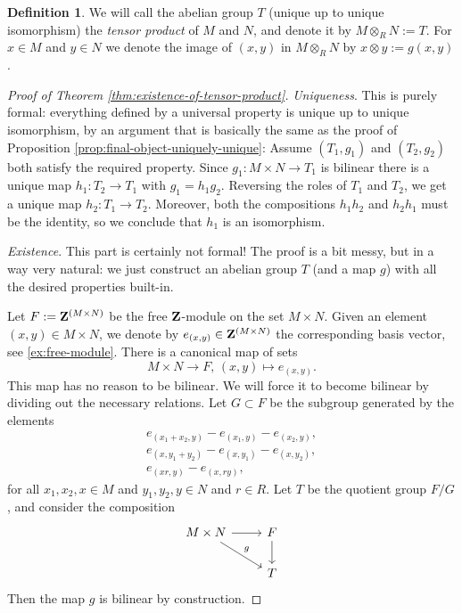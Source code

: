 \documentclass[11pt]{amsbook}
\theoremstyle{plain}
\theoremstyle{definition}
\newtheorem{definition}[theorem]{Definition}
\begin{document}
\begin{definition}We will call the abelian group $T$ (unique up to unique isomorphism) the \emph{tensor product} of $M$ and $N$, and denote it by $M\otimes_R N := T $. For $x\in M$ and $y\in N$ we denote the image of $(x,y)$ in $M\otimes_R N$ by $x\otimes y := g(x,y)$. 
\end{definition}


\begin{proof}[Proof of Theorem \ref{thm:existence-of-tensor-product}]
\emph{Uniqueness}. This is purely formal:  everything defined by a universal property is unique up to unique isomorphism, by an argument  that is basically the same as the proof of Proposition \ref{prop:final-object-uniquely-unique}: 
Assume $(T_1,g_1)$ and $(T_2,g_2)$ both satisfy the required property. Since $g_1\colon M\times N \to T_1$ is bilinear there is a unique map $h_1\colon T_2 \to T_1$ with $g_1=h_1g_2$. Reversing the roles of $T_1$ and $T_2$, we get a unique map $h_2\colon T_1\to T_2$. Moreover, both the compositions $h_1h_2$ and $h_2h_1$ must be the identity, so we conclude that $h_1$ is an isomorphism.

\emph{Existence}. This part is certainly not formal! The proof is a bit messy, but in a way very natural: we just construct an abelian group $T$ (and a map $g$) with all the desired properties built-in. 

Let $F:={\mathbf{Z}}^{(M\times N)}$ be the free ${\mathbf{Z}}$-module on the set $M\times N$. Given an element $(x,y) \in M\times N$, we denote by $e_{(x,y)} \in {\mathbf{Z}}^{(M\times N)}$ the corresponding basis vector, see \ref{ex:free-module}. There is a canonical map of sets
\[
	M\times N \to F,\, (x,y) \mapsto e_{(x,y)}.
\]
This map has no reason to be bilinear. We will force it to become bilinear by dividing out the necessary relations. Let $G\subset F$ be the subgroup generated by the elements
\begin{gather*}
	e_{(x_1+x_2,y)}-e_{(x_1,y)}-e_{(x_2,y)},\\
	e_{(x,y_1+y_2)}-e_{(x,y_1)}-e_{(x,y_2)},\\
	e_{(xr,y)}-e_{(x,ry)},
\end{gather*}
for all $x_1,x_2,x\in M$ and $y_1,y_2,y\in N$ and $r\in R$. Let $T$ be the quotient group $F/G$, and consider the composition
\[
\begin{tikzcd}
M\times N \arrow{r} \arrow{rd}{g} & F \arrow{d} \\
& T
\end{tikzcd}
\]
Then the map $g$ is bilinear by construction.


\end{proof}
\end{document}
